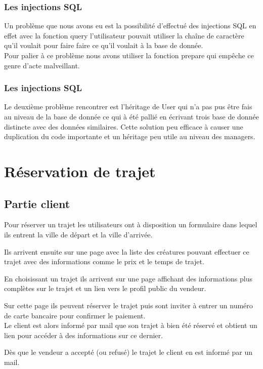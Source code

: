 \documentclass{article}
\begin{document}
		\subsubsection{Les injections SQL}
			Un problème que nous avons eu est la possibilité d'effectué des injections SQL en effet avec la fonction query l'utilisateur pouvait utiliser la chaîne de caractère qu'il voulait pour faire faire ce qu'il voulait à la base de donnée.\\ Pour palier à ce problème nous avons utiliser la fonction prepare qui empêche ce genre d'acte malveillant.
		\subsubsection{Les injections SQL}
			Le deuxième problème rencontrer est l'héritage de User qui n'a pas pus être fais au niveau de la base de donnée ce qui à été pallié en écrivant trois base de donnée distincte avec des données similaires. Cette solution peu efficace à causer une duplication du code importante et un héritage peu utile au niveau des managers.
			
\section{Réservation de trajet}
    \subsection{Partie client}
        Pour réserver un trajet les utilisateurs ont à disposition un formulaire dans lequel ils entrent la ville de départ et la ville d'arrivée.
        
        Ils arrivent ensuite sur une page avec la liste des créatures pouvant effectuer ce trajet avec des informations comme le prix et le temps de trajet.
        
        En choisissant un trajet ils arrivent sur une page affichant des informations plus complètes sur le trajet et un lien vers le profil public du vendeur.
        
        Sur cette page ils peuvent réserver le trajet puis sont inviter à entrer un numéro de carte bancaire pour confirmer le paiement.
        \\
        
        Le client est alors informé par mail que son trajet à bien été réservé et obtient un lien pour accéder à des informations sur ce dernier.
        
        Dès que le vendeur a accepté (ou refusé) le trajet le client en est informé par un mail.
        \\
        
\end{document}
